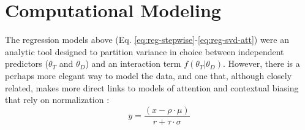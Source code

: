 \documentclass[a4paper, nobind]{templates/ociamthesis}
\begin{document}
\hypertarget{computational-modeling-1}{%
\section{Computational Modeling}\label{computational-modeling-1}}

The regression models above (Eq. \eqref{eq:reg-stepwise}-\eqref{eq:reg-svd-att}) were an analytic tool designed to partition variance in choice between independent predictors (\(\theta_T\) and \(\theta_D\)) and an interaction term \(f(\theta_T|\theta_D)\). However, there is a perhaps more elegant way to model the data, and one that, although closely related, makes more direct links to models of attention and contextual biasing that rely on normalization \autocite{reynolds2009}:
\begin{equation}
y = \frac{(x-\rho\cdot\mu)}{r+\tau\cdot\sigma}
\end{equation}
\end{document}
